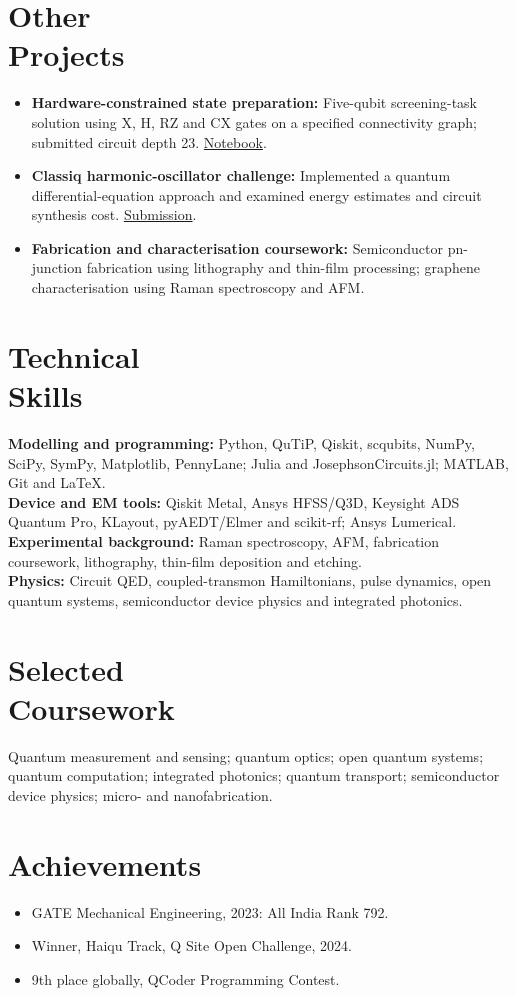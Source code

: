 \documentclass[margin,line]{resume}
\newcommand{\cvheading}[1]{\section{\mysidestyle #1}}
\begin{document}
\begin{resume}
\cvheading{Other\\Projects}
\begin{itemize}
\item \textbf{Hardware-constrained state preparation:} Five-qubit screening-task solution using X, H, RZ and CX gates on a specified connectivity graph; submitted circuit depth 23. \href{https://github.com/Mukul-Quantum-Researcher/QOSF-Cohort-10}{Notebook}.
\item \textbf{Classiq harmonic-oscillator challenge:} Implemented a quantum differential-equation approach and examined energy estimates and circuit synthesis cost. \href{https://github.com/Mukul-Quantum-Researcher/Q-SITE-Classiq-Open-Challenge}{Submission}.
\item \textbf{Fabrication and characterisation coursework:} Semiconductor pn-junction fabrication using lithography and thin-film processing; graphene characterisation using Raman spectroscopy and AFM.
\end{itemize}

\cvheading{Technical\\Skills}
\textbf{Modelling and programming:} Python, QuTiP, Qiskit, scqubits, NumPy, SciPy, SymPy, Matplotlib, PennyLane; Julia and JosephsonCircuits.jl; MATLAB, Git and \LaTeX.\\
\textbf{Device and EM tools:} Qiskit Metal, Ansys HFSS/Q3D, Keysight ADS Quantum Pro, KLayout, pyAEDT/Elmer and scikit-rf; Ansys Lumerical.\\
\textbf{Experimental background:} Raman spectroscopy, AFM, fabrication coursework, lithography, thin-film deposition and etching.\\
\textbf{Physics:} Circuit QED, coupled-transmon Hamiltonians, pulse dynamics, open quantum systems, semiconductor device physics and integrated photonics.

\cvheading{Selected\\Coursework}
Quantum measurement and sensing; quantum optics; open quantum systems; quantum computation; integrated photonics; quantum transport; semiconductor device physics; micro- and nanofabrication.

\cvheading{Achievements}
\begin{itemize}
\item GATE Mechanical Engineering, 2023: All India Rank 792.
\item Winner, Haiqu Track, Q Site Open Challenge, 2024.
\item 9th place globally, QCoder Programming Contest.
\end{itemize}

\end{resume}
\end{document}
